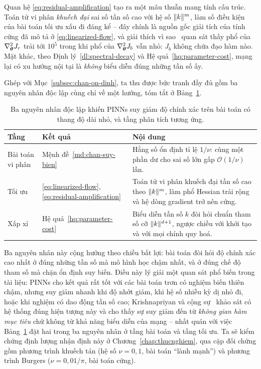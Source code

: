 Quan hệ \eqref{eq:residual-amplification} tạo ra một mâu thuẫn mang tính cấu
trúc. Toán tử vi phân \emph{khuếch đại} sai số tần số cao với hệ số
$\lVert k\rVert^{m}$, làm số điều kiện của bài toán tối ưu xấu đi đáng kể -- đây chính
là nguồn gốc giải tích của tính cứng đã mô tả ở \eqref{eq:linearized-flow}, và
giải thích vì sao~\cite{wang2021} quan sát thấy phổ của
$\nabla^2_{\bm{\theta}}J_r$ trải tới $10^5$ trong khi phổ của
$\nabla^2_{\bm{\theta}}J_b$ vẫn nhỏ: $J_b$ không chứa đạo hàm nào. Mặt khác, theo
Định lý~\ref{dl:spectral-decay} và Hệ quả~\ref{hq:parameter-cost}, mạng lại có xu
hướng nội tại là \emph{không} biểu diễn đúng những tần số ấy.
 
Ghép với Mục~\ref{subsec:chan-on-dinh}, ta thu được bức tranh đầy đủ gồm ba
nguyên nhân độc lập cùng chỉ về một hướng, tóm tắt ở Bảng~\ref{tab:ba-nguyen-nhan}.
 
\begin{table}[htbp]
\centering
\caption{Ba nguyên nhân độc lập khiến PINNs suy giảm độ chính xác trên bài toán
có thang độ dài nhỏ, và tầng phân tích tương ứng.}
\label{tab:ba-nguyen-nhan}
\small
\begin{tabular}{@{}l l p{6.4cm}@{}}
\toprule
\textbf{Tầng} & \textbf{Kết quả} & \textbf{Nội dung} \\
\midrule
Bài toán vi phân & Mệnh đề~\ref{md:chan-suy-bien}
  & Hằng số ổn định tỉ lệ $1/\nu$: cùng một phần dư cho sai số lớn gấp
    $\mathcal{O}(1/\nu)$ lần. \\
\addlinespace
Tối ưu & \eqref{eq:linearized-flow}, \eqref{eq:residual-amplification}
  & Toán tử vi phân khuếch đại tần số cao theo $\lVert k\rVert^m$, làm phổ Hessian
    trải rộng và hệ dòng gradient trở nên cứng. \\
\addlinespace
Xấp xỉ & Hệ quả~\ref{hq:parameter-cost}
  & Biểu diễn tần số $k$ đòi hỏi chuẩn tham số cỡ $\lVert k\rVert^{d+1}$, ngược chiều
    với khởi tạo và với mọi chính quy hoá. \\
\bottomrule
\end{tabular}
\end{table}
 
Ba nguyên nhân này cộng hưởng theo chiều bất lợi: bài toán đòi hỏi độ chính xác
cao nhất ở đúng những tần số mà mô hình học chậm nhất, và ở đúng chế độ tham số
mà chặn ổn định suy biến. Điều này lý giải một quan sát phổ biến trong tài liệu:
PINNs cho kết quả rất tốt với các bài toán trơn có nghiệm biến thiên chậm, nhưng
suy giảm nhanh khi độ nhớt giảm, khi hệ số nhiễu kỳ dị nhỏ đi, hoặc khi nghiệm có
dao động tần số cao; Krishnapriyan và cộng sự~\cite{krishnapriyan2021} khảo sát
có hệ thống đúng hiện tượng này và cho thấy sự suy giảm đến từ \emph{không gian
hàm mục tiêu} chứ không từ khả năng biểu diễn của mạng -- nhất quán với việc
Bảng~\ref{tab:ba-nguyen-nhan} đặt hai trong ba nguyên nhân ở tầng bài toán và
tầng tối ưu. Ta sẽ kiểm chứng định lượng nhận định này ở
Chương~\ref{chap:thucnghiem}, qua cặp đối chứng gồm phương trình khuếch tán
(hệ số $\nu = 0{,}1$, bài toán ``lành mạnh'') và phương trình Burgers
($\nu = 0{,}01/\pi$, bài toán cứng).
 
